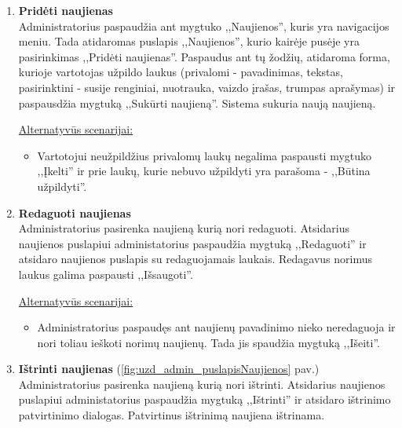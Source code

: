 \documentclass{VUMIFPSkursinis}
\begin{document}
\begin{enumerate} [label = \textbf{U\arabic*.}]
					\underline{Alternatyvūs scenarijai:}
					\begin{itemize}
						\item Jei vartotojas spaudžia mygtuką ,,Skirti vadovu'' ir uždaro patvirtinimo langą. Vadovas nėra pakeičiamas.
						\item Jei vartotojas spaudžia ,,Skirti vadovu'', o pasirinktas vartotojas jau yra išėjęs iš komandos, jis pašalinamas iš sąrašo ir parodomas pranešimas kad pasirinktas vartojas nėra komandos narys.						
					\end{itemize}
				
			\item \textbf{Pridėti naujienas}   \\
					Administratorius paspaudžia ant mygtuko ,,Naujienos'', kuris yra navigacijos meniu. Tada atidaromas puslapis ,,Naujienos'', kurio kairėje pusėje yra pasirinkimas ,,Pridėti naujienas''. Paspaudus ant tų žodžių, atidaroma forma, kurioje vartotojas užpildo laukus (privalomi - pavadinimas, tekstas, pasirinktini - susije renginiai, nuotrauka, vaizdo įrašas, trumpas aprašymas) ir paspausdžia mygtuką ,,Sukūrti naujieną''. Sistema sukuria naują naujieną.
					
					\underline{Alternatyvūs scenarijai:}
					\begin{itemize}
						\item Vartotojui neužpildžius privalomų laukų negalima paspausti mygtuko ,,Įkelti'' ir prie laukų, kurie nebuvo užpildyti yra parašoma - ,,Būtina užpildyti''.
					\end{itemize}
			
			\item \textbf{Redaguoti naujienas}   \\
					Administratorius pasirenka naujieną kurią nori redaguoti. Atsidarius naujienos puslapiui administatorius paspaudžia mygtuką ,,Redaguoti'' ir atsidaro naujienos puslapis su redaguojamais laukais. Redagavus norimus laukus galima paspausti ,,Išsaugoti''.
					
					\underline{Alternatyvūs scenarijai:}
					\begin{itemize}
						\item Administratorius paspaudęs ant naujienų pavadinimo nieko neredaguoja ir nori toliau ieškoti norimų naujienų. Tada jis spaudžia mygtuką ,,Išeiti''.
					\end{itemize}	
			
			\item \textbf{Ištrinti naujienas} (\ref{fig:uzd_admin_puslapisNaujienos} pav.)\\
					Administratorius pasirenka naujieną kurią nori ištrinti. Atsidarius naujienos puslapiui administatorius paspaudžia mygtuką ,,Ištrinti'' ir atsidaro ištrinimo patvirtinimo dialogas. Patvirtinus ištrinimą naujiena ištrinama.
					

\end{enumerate}
\end{document}
